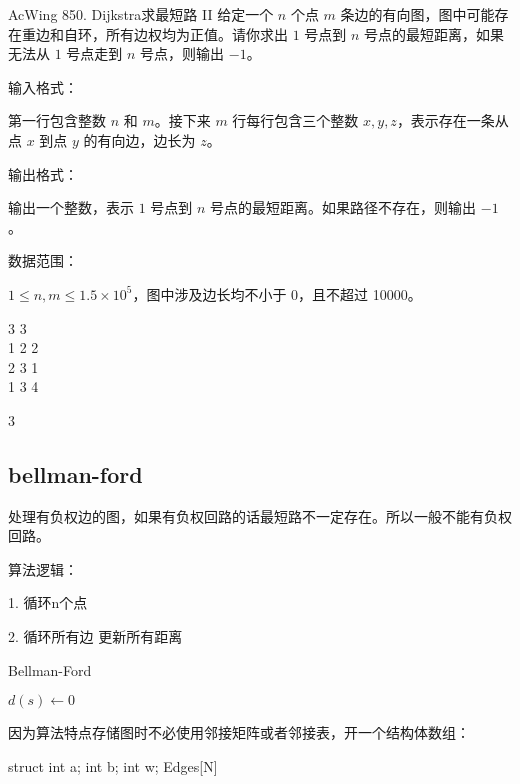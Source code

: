 \begin{titledbox}{AcWing 850. Dijkstra求最短路 II}
    给定一个 $n$ 个点 $m$ 条边的有向图，图中可能存在重边和自环，所有边权均为正值。请你求出 $1$ 号点到 $n$ 号点的最短距离，如果无法从 $1$ 号点走到 $n$ 号点，则输出 $-1$。

    输入格式：

    第一行包含整数 $n$ 和 $m$。接下来 $m$ 行每行包含三个整数 $x,y,z$，表示存在一条从点 $x$ 到点 $y$ 的有向边，边长为 $z$。

    输出格式：

    输出一个整数，表示 $1$ 号点到 $n$ 号点的最短距离。如果路径不存在，则输出 $-1$。

    数据范围：

    $1 \le n, m \le 1.5 \times 10^5$，图中涉及边长均不小于 0，且不超过 10000。

    \begin{inputblock}
        3 3 \\
        1 2 2 \\
        2 3 1 \\
        1 3 4
    \end{inputblock}
    \begin{outputblock}
        3
    \end{outputblock}
\end{titledbox}

\subsection{bellman-ford}
处理有负权边的图，如果有负权回路的话最短路不一定存在。所以一般不能有负权回路。

算法逻辑：

1. 循环n个点

2. 循环所有边  更新所有距离

\begin{algorithm}[H] %
    \caption{Bellman-Ford}
    \SetAlgoLined
    $d(s) \leftarrow 0$\\
\end{algorithm}

因为算法特点存储图时不必使用邻接矩阵或者邻接表，开一个结构体数组：

\begin{mycpponecol}[边集]
    struct {
        int a;
        int b;
        int w;
    } Edges[N]
\end{mycpponecol}

